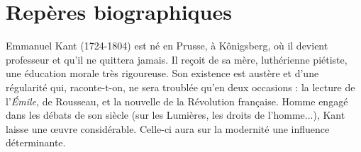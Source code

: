 
\section{Repères biographiques}

Emmanuel Kant (1724-1804) est né en Prusse, à
Kônigsberg, où il devient professeur
et qu'il ne quittera jamais. Il reçoit de
sa mère, luthérienne piétiste, une
éducation morale très rigoureuse.
Son existence est austère et d’une
régularité qui, raconte-t-on, ne sera
troublée qu’en deux occasions : la
lecture de l'{\it Émile}, de Rousseau, et la
nouvelle de la Révolution française.
Homme engagé dans les débats de
son siècle (sur les Lumières, les
droits de l’homme...), Kant laisse une
œuvre considérable. Celle-ci aura sur
la modernité une influence déterminante.

